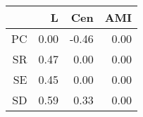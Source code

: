 \begin{table}[ht]
\centering
\begin{tabular}{rrrr}
  \hline
 & L & Cen & AMI \\ 
  \hline
PC & 0.00 & -0.46 & 0.00 \\ 
  SR & 0.47 & 0.00 & 0.00 \\ 
  SE & 0.45 & 0.00 & 0.00 \\ 
  SD & 0.59 & 0.33 & 0.00 \\ 
   \hline
\end{tabular}
\end{table}
